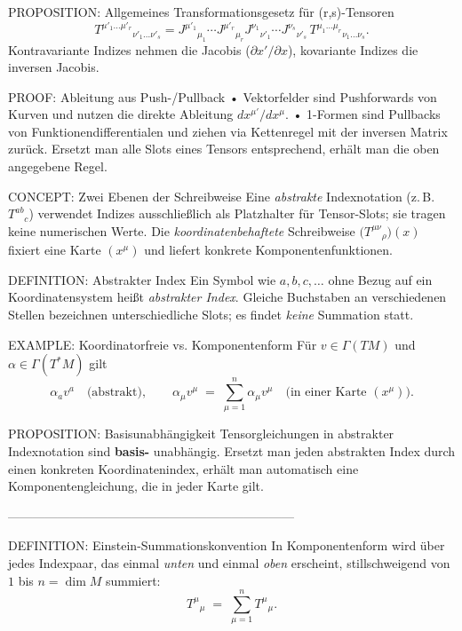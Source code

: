 \documentclass[10pt, letterpaper]{article}
\begin{document}
PROPOSITION: Allgemeines Transformationsgesetz für (r,s)-Tensoren  
\[
T^{\mu'_1\dots\mu'_r}{}_{\nu'_1\dots\nu'_s}
=
J^{\mu'_1}{}_{\mu_1}\cdots J^{\mu'_r}{}_{\mu_r}
J^{\nu_1}{}_{\nu'_1}\cdots J^{\nu_s}{}_{\nu'_s}
\,
T^{\mu_1\dots\mu_r}{}_{\nu_1\dots\nu_s}.
\]
Kontravariante Indizes nehmen die Jacobis (\(\partial x'/\partial x\)),
kovariante Indizes die inversen Jacobis.

PROOF: Ableitung aus Push-/Pullback  
• Vektorfelder sind Pushforwards von Kurven und nutzen die direkte
Ableitung \(dx^{\mu'}/dx^{\mu}\).  
• 1-Formen sind Pullbacks von Funktionendifferentialen und ziehen via
Kettenregel mit der inversen Matrix zurück.  
Ersetzt man alle Slots eines Tensors entsprechend, erhält man die oben
angegebene Regel.





CONCEPT: Zwei Ebenen der Schreibweise  
Eine \emph{abstrakte} Indexnotation (z.\,B.\ $T^{ab}{}_c$) verwendet
Indizes ausschließlich als Platzhalter für Tensor-Slots; sie tragen
keine numerischen Werte.  
Die \emph{koordinatenbehaftete} Schreibweise
$\bigl(T^{\mu\nu}{}_{\rho}\bigr)(x)$ fixiert eine Karte $(x^\mu)$ und
liefert konkrete Komponentenfunktionen.





DEFINITION: Abstrakter Index  
Ein Symbol wie $a,b,c,\dots$ ohne Bezug auf ein Koordinatensystem heißt
\emph{abstrakter Index}. Gleiche Buchstaben an verschiedenen Stellen
bezeichnen unterschiedliche Slots; es findet \emph{keine} Summation
statt.

EXAMPLE: Koordinatorfreie vs. Komponentenform  
Für $v\in\Gamma(TM)$ und $\alpha\in\Gamma(T^*M)$ gilt  
\[
\alpha_a v^a \quad\text{(abstrakt)}, \qquad
\alpha_\mu v^\mu \;=\;\sum_{\mu=1}^n \alpha_\mu v^\mu
\quad\text{(in einer Karte $(x^\mu)$).}
\]

PROPOSITION: Basisunabhängigkeit  
Tensorgleichungen in abstrakter Indexnotation sind \textbf{basis-}
unabhängig. Ersetzt man jeden abstrakten Index durch einen konkreten
Koordinatenindex, erhält man automatisch eine Komponentengleichung,
die in jeder Karte gilt.

---------------------------------------------------------------------


DEFINITION: Einstein-Summationskonvention  
In Komponentenform wird über jedes Indexpaar, das einmal \emph{unten}
und einmal \emph{oben} erscheint, stillschweigend von $1$ bis
$n=\dim M$ summiert:  
\[
T^\mu{}_\mu \;=\;\sum_{\mu=1}^n T^\mu{}_\mu .
\]
\end{document}
